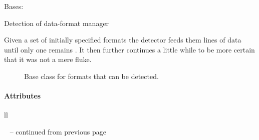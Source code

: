 \documentclass[letterpaper,10pt,english]{sphinxmanual}
\begin{document}
\begin{fulllineitems}
\label{fseq.reading:fseq.reading.seq_encoder.SeqFormatDetector}
Bases: 

Detection of data-format manager

Given a set of initially specified formats the detector feeds them lines
of data until only one remains .
It then further continues a little while to be more certain that it
was not a mere fluke.



\begin{description}
\item[{{\hyperref[fseq.reading:fseq.reading.seq_encoder.SeqFormat]{}}}] \leavevmode
Base class for formats that can be detected.

\end{description}


\paragraph{Attributes}

\begin{longtable}{ll}
\hline
\endfirsthead

%
{{\textsf{\tablename\ \thetable{} -- continued from previous page}}} \\
\hline
\endhead

\hline {} \\ \hline
\endfoot

\endlastfoot



\end{longtable}
\end{fulllineitems}
\end{document}
